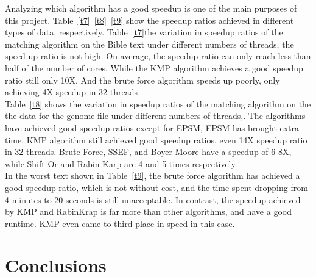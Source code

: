 \documentclass[11pt]{article}       %
\newcommand{\includeFig}[3]      {\begin{figure}[htb] \begin{center}
                                 \includegraphics
                                 [width=4in,keepaspectratio] %
                                 {#2}\caption{\label{#1}#3} \end{center} \end{figure}}
\begin{document}
Analyzing which algorithm has a good speedup is one of the main purposes of this project. Table~\ref{t7}~\ref{t8}~\ref{t9} show the speedup ratios achieved in different types of data, respectively. Table~\ref{t7}the variation in speedup ratios of the matching algorithm on the Bible text under different numbers of threads, the speed-up ratio is not high. On average, the speedup ratio can only reach less than half of the number of cores. While the KMP algorithm achieves a good speedup ratio still only 10X. And the brute force algorithm speeds up poorly, only achieving 4X speedup in 32 threads\\ 
Table~\ref{t8} shows the variation in speedup ratios of the matching algorithm on the the data for the genome file under different numbers of threads,. The algorithms have achieved good speedup ratios except for EPSM, EPSM has brought extra time. KMP algorithm still achieved good speedup ratios, even 14X speedup ratio in 32 threads. Brute Force, SSEF, and Boyer-Moore have a speedup of 6-8X, while Shift-Or and Rabin-Karp are 4 and 5 times respectively.\\
In the worst text shown in Table~\ref{t9}, the brute force algorithm has achieved a good speedup ratio, which is not without cost, and the time spent dropping from 4 minutes to 20 seconds is still unacceptable. In contrast, the speedup achieved by KMP and RabinKrap is far more than other algorithms, and have a good runtime. KMP even came to third place in speed in this case.






\section{Conclusions} \label{concl}
\end{document}
